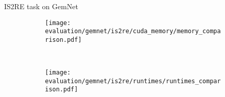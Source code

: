 \begin{frame}{IS2RE task on GemNet}

    \begin{figure}[H]
        \centering
    
        \begin{subfigure}[t]{0.48\textwidth}
            \centering
            \texttt{[image: evaluation/gemnet/is2re/cuda\_memory/memory\_comparison.pdf]}
        \end{subfigure}%
        ~
        \begin{subfigure}[t]{0.48\textwidth}
            \centering
            \texttt{[image: evaluation/gemnet/is2re/runtimes/runtimes\_comparison.pdf]}
        \end{subfigure}

        \vspace*{-0.5em}
    

\end{figure}
\end{frame}
